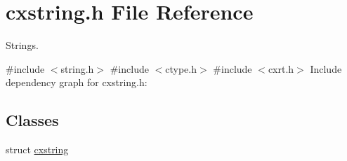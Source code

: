 \hypertarget{a00026}{}\section{cxstring.\+h File Reference}
\label{a00026}


Strings.  


{\ttfamily \#include $<$string.\+h$>$}\newline
{\ttfamily \#include $<$ctype.\+h$>$}\newline
{\ttfamily \#include $<$cxrt.\+h$>$}\newline
Include dependency graph for cxstring.\+h\+:
\subsection*{Classes}
\begin{DoxyCompactItemize}
\item 
struct \hyperlink{a00072}{cxstring}
\end{DoxyCompactItemize}
